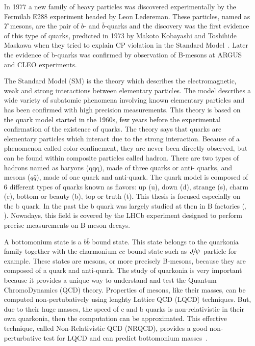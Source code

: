 In 1977 a new family of heavy particles was discovered experimentally by the
Fermilab E288 experiment headed by Leon Ledereman\cite{Herb:1977ek}. These
particles, named as $\Upsilon$ mesons, are the pair of $b$- and
$\bar{b}$-quarks and the discovery was the first evidence of this type of
quarks, predicted in 1973 by Makoto Kobayashi and Toshihide Maskawa when they
tried to explain CP violation in the Standard Model~\cite{Kobayashi:1973fv}.
Later the evidence of b-quarks was confirmed by observation of B-mesons at
ARGUS\cite{Albrecht:1986nr} and CLEO\cite{Bebek:1987bp} experiments.

The Standard Model (SM) is the theory which describes the electromagnetic,
weak and strong interactions between elementary particles. The model describes
a wide variety of subatomic phenomena involving known elementary particles and
has been confirmed with high precision measurements. This theory is based on
the quark model started in the 1960s\cite{GellMann:1964nj,Zweig:1981pd}, few
years before the experimental confirmation of the existence of quarks. The
theory says that quarks are elementary particles which interact due to the
strong interaction. Because of a phenomenon called color confinement, they are
never been directly observed,  but can be found within composite particles
called hadron. There are two types of hadrons named as baryons (qqq), made of
three quarks or anti- quarks, and mesons ($q\bar{q}$), made of one quark and
anti-quark. The quark model is composed of 6 different types of quarks known as
flavors: up (u), down (d), strange (s), charm (c), bottom or beauty (b), top or
truth (t). This thesis is focused especially on the b quark. In the past the b
quark was largely studied at \lep then in B factories (\babar, \belle).
Nowadays, this field is covered by the LHCb experiment designed to perform
precise measurements on B-meson decays.

A bottomonium state is a $b\bar{b}$ bound state. This state belongs to the
quarkonia family together with the charmonium $c\bar{c}$ bound
state such as ${{J\mskip -3mu/\mskip -2mu\psi\mskip 2mu}}$ particle for example. These states are mesons, or more
precisely B-mesons, because they are composed of a quark and anti-quark. The
study of quarkonia is very important because it provides a unique way to
understand and test the Quantum ChromoDynamics (QCD) theory. Properties of
mesons, like their masses, can be computed non-pertubatively using lenghty
Lattice QCD (LQCD) techniques. But, due to their huge masses, the speed of c
and b quarks is non-relativistic in their own quarkonia, then the computation
can be approximated. This effective technique, called Non-Relativistic QCD
(NRQCD), provides a good non-perturbative test for LQCD and can predict
bottomonium masses~\cite{Dowdall:2011iy,Dowdall:2012ab}.

